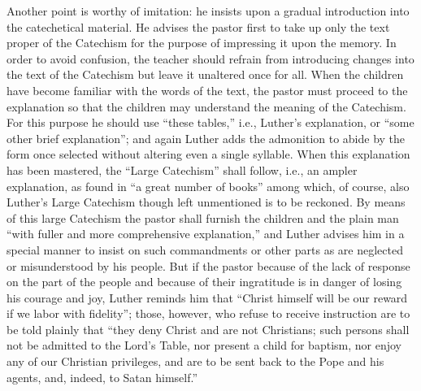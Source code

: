 Another point is worthy of imitation: he insists upon a gradual introduction into the catechetical material. He advises the pastor first to take up only the text proper of the Catechism for the purpose of impressing it upon the memory. In order to avoid confusion, the teacher should refrain from introducing changes into the text of the Catechism but leave it unaltered once for all. When the children have become familiar with the words of the text, the pastor must proceed to the explanation so that the children
may understand the meaning of the Catechism. For this purpose he should use “these tables,” i.e., Luther’s explanation, or “some other brief explanation”; and again Luther adds the admonition to abide by the form once selected without altering even a single syllable. When this explanation has been mastered, the “Large Catechism” shall follow, i.e., an ampler explanation, as found in “a great number of books” among which, of course, also Luther’s Large Catechism though left unmentioned is to be reckoned. By means of this large Catechism the pastor shall furnish the children and the plain man “with fuller and more comprehensive explanation,” and Luther advises him in a special manner to insist on such commandments or other parts as are neglected or misunderstood by his people. But if the pastor because of the lack of response on the part of the people and because of their ingratitude is in danger of losing his courage and joy, Luther reminds him that “Christ himself will be our reward if we labor with fidelity”; those, however, who refuse to receive instruction are to be told plainly that “they deny Christ and are not Christians; such persons shall not be admitted to the Lord’s Table, nor present a child for baptism, nor enjoy any of our Christian privileges, and are to be sent back to the Pope and his agents, and, indeed, to Satan himself.”


